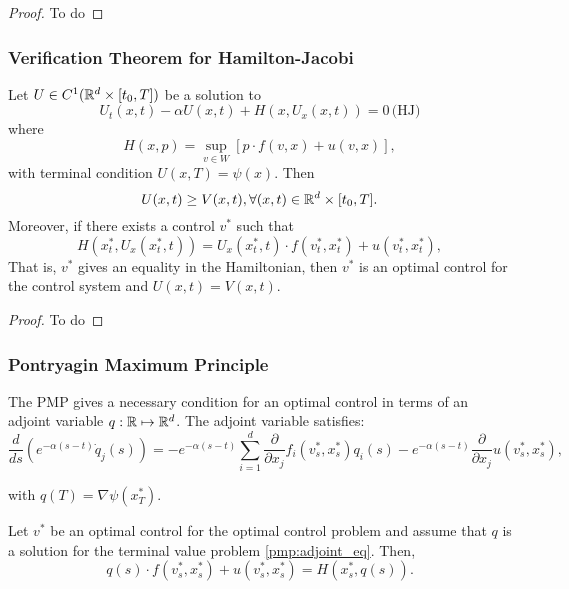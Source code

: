 \documentclass{article}
\begin{document}
\begin{proof}
    To do
\end{proof}

\subsubsection{Verification Theorem for Hamilton-Jacobi}
\begin{proposition}
    Let $U \in C^1(\mathbb{R}^d \times [t_0, T])$ be a solution to 
    $$
    U_t(x,t) - \alpha U(x,t) + H(x, U_x(x,t)) = 0\, \text{(HJ)}
    $$
    where 
    $$
    H(x,p) = \sup_{v \in W} [p \cdot f(v,x) + u(v,x)],
    $$
    with terminal condition $U(x,T) = \psi(x)$. Then
    $$U(x,t) \geq V(x,t), \forall (x,t) \in \mathbb{R}^d \times [t_0,T].$$
    Moreover, if there exists a control $v^*$ such that
    $$
    H(x^*_t, U_x (x^*_t, t)) = U_x(x^*_t, t)\cdot f(v^*_t, x^*_t) + u(v^*_t, x^*_t),
    $$
    That is, $v^*$ gives an equality in the Hamiltonian, then $v^*$ is an optimal control for the control system and $U(x,t) = V(x,t)$.
\end{proposition}

\begin{proof}
    To do
\end{proof}

\subsubsection{Pontryagin Maximum Principle}

The PMP gives a necessary condition for an optimal control in terms of an adjoint variable $q: \mathbb{R} \mapsto \mathbb{R}^d$. The adjoint variable satisfies:
\begin{equation}\label{pmp:adjoint_eq}
    \frac{d}{ds} \left( e^{-\alpha(s-t)} {\dot q}_j(s) \right) = -e^{-\alpha (s - t)} \sum_{i = 1}^d \frac{\partial}{\partial x_j} f_i (v^*_s, x^*_s) q_i(s) - e^{-\alpha (s - t)} \frac{\partial}{\partial x_j} u(v^*_s, x^*_s),
\end{equation}

with $q(T) = \nabla \psi(x^*_T)$.

\begin{proposition}
    Let $v^*$ be an optimal control for the optimal control problem and assume that $q$ is a solution for the terminal value problem \eqref{pmp:adjoint_eq}. Then,
    \begin{equation}\label{pmp:transversality_condition}
    q(s) \cdot f(v^*_s, x^*_s) + u(v^*_s, x^*_s) = H(x^*_s, q(s)).
    \end{equation}
\end{proposition}
\end{document}
